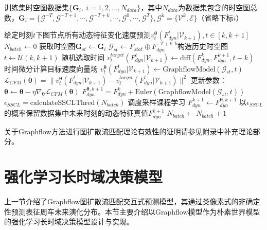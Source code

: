       \begin{algorithm}
        \caption{Graphflow训练流程}
        \label{alg:train_graphflow}
        \small
        \begin{algorithmic}
          \REQUIRE 训练集时空图数据集$\{\mathbf{G}_i, ~i = 1,2,\dots,N_{data}\}$，其中$N_{data}$为数据集包含的时空图总数，$\mathbf{G}_i = \{\mathcal{G}^{-T},\mathcal{G}^{-T+1},\cdots,\mathcal{G}^{-T+k},\cdots,\mathcal{G}^0,\cdots, \mathcal{G}^{T}\}, \mathcal{G}^k=\{\mathcal{V}^k,\mathcal{E}\}$（省略下标$i$）

          \ENSURE 给定时刻$t$下图节点所有动态特征变化速度预测$v_t^{\bm{\theta}}(F_{dyn}^{t}|\mathcal{V}_{k+1}), t\in [k,k+1]$
          \STATE $N_{batch} \leftarrow 0$
              \STATE 获取时空图$\mathbf{G}_{st}\leftarrow\mathbf{G}_i$ 
                \STATE $\mathcal{G}_{st}\leftarrow F_{stat} \oplus F_{dyn}^{-T+k:k} $构造历史时空图
                \STATE $t \leftarrow \mathcal{U}(k,k+1)$ 随机选取时间
                \STATE $v_t^{target}(F_{dyn}^{t}|\mathcal{V}_{k+1})\leftarrow \text{diff}(F_{dyn}^{k},F_{dyn}^{k+1},t-k)$ 时间微分计算目标速度向量场
                \STATE $v_t^{\bm{\theta}}(F_{dyn}^{t}|\mathcal{V}_{k+1}) \leftarrow \text{GraphflowModel}(\mathcal{G}_{st},t)$
                \STATE $\mathcal{L}_{CFM}(\bm{\theta}) = \lVert v_t^{\bm{\theta}}(F_{dyn}^{t}|\mathcal{V}_{k+1}) - v_t^{target}(F_{dyn}^{t}|\mathcal{V}_{k+1}) \rVert^2$
                \STATE 更新参数：$\bm{\theta} \leftarrow \bm{\theta} - \eta \nabla_{\bm{\theta}} \mathcal{L}_{CFM}(\bm{\theta})$
                \STATE $F_{dyn}^{\bm{\theta},k+1} = F_{dyn}^{k} + \text{Euler}(\text{GraphflowModel}(\mathcal{G}_{st},t))$
                \STATE $\epsilon_{SSCL} = \text{calculateSSCLThred}(N_{batch}) $ 调度采样课程学习
                  \STATE $F_{dyn}^{k+1} \leftarrow F_{dyn}^{\bm{\theta},k+1}$  以$\epsilon_{SSCL}$的概率保留数据集中未来时刻的动态特征真值$F_{dyn}^{k+1}$
                \ENDIF
                \STATE $N_{batch} \leftarrow N_{batch} + 1$
              \ENDFOR
            \ENDFOR
          \ENDFOR
        \end{algorithmic}
      \end{algorithm}

    关于Graphflow方法进行图扩散流匹配理论有效性的证明请参见附录中补充理论部分\cite{KomasaQi2026MasterThesis_repo}。


\section{强化学习长时域决策模型}
  上一节介绍了Graphflow图扩散流匹配交互式预测模型，其通过类像素式的非确定性预测表征周车未来演化分布。本节主要介绍以Graphflow模型作为朴素世界模型的强化学习长时域决策模型设计与实现。

